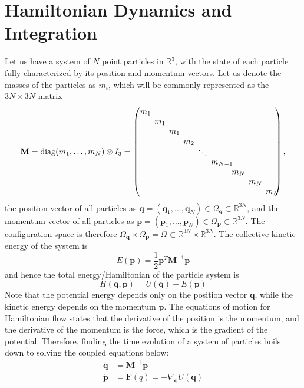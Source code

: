 \documentclass{article}
\theoremstyle{remark}
\theoremstyle{definition}
\begin{document}
\section{Hamiltonian Dynamics and Integration}
Let us have a system of $N$ point particles in $\mathbb{R}^3$, with the state of each particle fully characterized by its position and momentum vectors. Let us denote the masses of the particles as $m_i$, which will be commonly represented as the $3N \times 3N$ matrix  
\[\mathbf{M} = \mathrm{diag}(m_1, \ldots, m_N) \otimes I_3 = \begin{pmatrix}
m_1\hspace{-2mm}& & & & & & & & \\ 
& m_1\hspace{-2mm}& & & & & & & \\ 
& & m_1\hspace{-2mm}& & & & & & \\ 
& & & m_2 \hspace{-2mm}& & & & & \\[-1mm] 
& & & & \ddots \hspace{-2mm} & & & & \\[-1mm] 
& & & & & m_{N-1}\hspace{-4mm} & & & \\ 
& & & & & & m_N \hspace{-2mm}& & \\ 
& & & & & & & m_N\hspace{-2mm} & \\ 
& & & & & & & & m_N\hspace{-2mm} \end{pmatrix}, \]
the position vector of all particles as $\mathbf{q} = (\mathbf{q}_1, \ldots, \mathbf{q}_N) \in \Omega_\mathbf{q} \subset \mathbb{R}^{3N}$, and the momentum vector of all particles as $\mathbf{p} = (\mathbf{p}_1, \ldots, \mathbf{p}_N) \in \Omega_\mathbf{p} \subset \mathbb{R}^{3N}$. The configuration space is therefore $\Omega_\mathbf{q} \times \Omega_\mathbf{p} = \Omega \subset \mathbb{R}^{3N} \times \mathbb{R}^{3N}$. The collective kinetic energy of the system is 
\[E (\mathbf{p}) = \frac{1}{2} \mathbf{p}^T \mathbf{M}^{-1} \mathbf{p}\]
and hence the total energy/Hamiltonian of the particle system is 
\[H(\mathbf{q}, \mathbf{p}) = U(\mathbf{q}) + E(\mathbf{p})\]
Note that the potential energy depends only on the position vector $\mathbf{q}$, while the kinetic energy depends on the momentum $\mathbf{p}$. The equations of motion for Hamiltonian flow states that the derivative of the position is the momentum, and the derivative of the momentum is the force, which is the gradient of the potential. Therefore, finding the time evolution of a system of particles boils down to solving the coupled equations below: 
\begin{align*}
    \boldsymbol{\dot{q}} & = \mathbf{M}^{-1} \mathbf{p} \\
    \boldsymbol{\dot{p}} & = \mathbf{F}(q) = - \nabla_\mathbf{q} U(\mathbf{q})
\end{align*}
\end{document}
